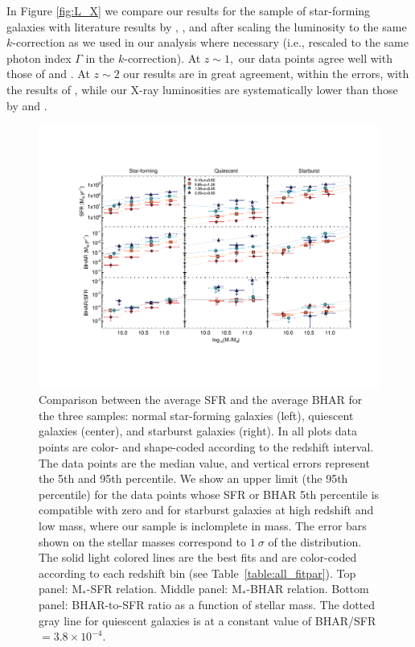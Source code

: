 In Figure \ref{fig:L_X} we compare our results for the sample of star-forming galaxies with literature results by \citet{2012ApJ...753L..30M}, \citet{2015ApJ...800L..10R}, and \citet{2018MNRAS.474.1225A} after scaling the luminosity to the same $k$-correction as we used in our analysis where necessary (i.e., rescaled to the same photon index $\Gamma$ in the $k$-correction). At $z\sim1,$ our data points agree well with those of \citet{2012ApJ...753L..30M} and \citet{2018MNRAS.474.1225A}.
At $z\sim2$ our results are in great agreement, within the errors, with the results of \citet{2018MNRAS.474.1225A}, while our X-ray luminosities are systematically lower than those by \citet{2012ApJ...753L..30M} and \citet{2015ApJ...800L..10R}.
   \begin{figure}
   \centering
   \includegraphics[trim={3.2cm 3.7cm 2cm 3.6cm}, clip,width=\textwidth]{Figs/SF_BH_all.pdf}
      \caption{Comparison between the average SFR and the average BHAR for the three samples: normal star-forming galaxies (left), quiescent galaxies (center), and starburst galaxies (right).
      In all plots data points are color- and shape-coded according to the redshift interval. The data points are the median value, and vertical errors represent the 5th and 95th percentile. We show an upper limit (the 95th percentile) for the data points whose SFR or BHAR 5th percentile is compatible with zero and for starburst galaxies at high redshift and low mass, where our sample is inclomplete in mass.
      The error bars shown on the stellar masses correspond to $1~\sigma$ of the distribution. The solid light colored lines are the best fits and are color-coded according to each redshift bin (see Table~\ref{table:all_fitpar}). 
      Top panel: M$_*$-SFR relation. 
      Middle panel: M$_*$-BHAR relation.
      Bottom panel: BHAR-to-SFR ratio as a function of stellar mass. The dotted gray line for quiescent galaxies is at a constant value of BHAR/SFR$=3.8\times 10^{-4}$.
              }
         \label{fig:SF_BH_all}
   \end{figure}
